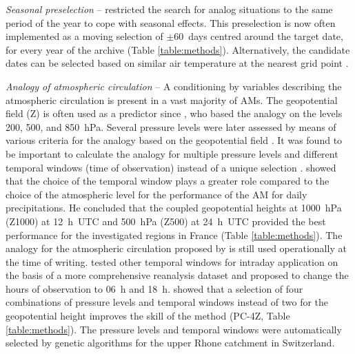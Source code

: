 \documentclass[gmdd]{copernicus}
\begin{document}
\textit{Seasonal preselection} -- \citet{Lorenz1969} restricted the search for analog situations to the same period of the year to cope with seasonal effects. This preselection is now often implemented as a moving selection of $\pm$60~days centred around the target date, for every year of the archive (Table \ref{table:methods}). Alternatively, the candidate dates can be selected based on similar air temperature at the nearest grid point \citep[Table \ref{table:methods}][]{BenDaoud2016}.

\textit{Analogy of atmospheric circulation} -- A conditioning by variables describing the atmospheric circulation is present in a vast majority of AMs. The geopotential field (Z) is often used as a predictor since \citet{Lorenz1969}, who based the analogy on the levels 200, 500, and 850~hPa. Several pressure levels were later assessed by means of various criteria for the analogy based on the geopotential field \citep{Duband1970, Duband1974, Duband1981, Guilbaud1997}. It was found to be important to calculate the analogy for multiple pressure levels and different temporal windows (time of observation) instead of a unique selection \citep{Guilbaud1998, Obled2002}. \citet{Bontron2004} showed that the choice of the temporal window plays a greater role compared to the choice of the atmospheric level for the performance of the AM for daily precipitations. He concluded that the coupled geopotential heights at 1000~hPa (Z1000) at 12~h~UTC and 500~hPa (Z500) at 24~h~UTC provided the best performance \citep[for a subset of the NCEP/NCAR Reanalysis I;][]{Kalnay1996, Kistler2001} for the investigated regions in France (Table \ref{table:methods}). The analogy for the atmospheric circulation proposed by \citet{Bontron2004} is still used operationally at the time of writing. \citet{Marty2010} tested other temporal windows for intraday application on the basis of a more comprehensive reanalysis dataset and proposed to change the hours of observation to 06~h and 18~h. \citet{Horton2018a} showed that a selection of four combinations of pressure levels and temporal windows instead of two for the geopotential height improves the skill of the method (PC-4Z, Table \ref{table:methods}). The pressure levels and temporal windows were automatically selected by genetic algorithms for the upper Rhone catchment in Switzerland.
\end{document}
